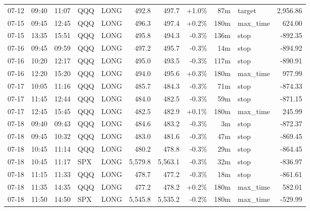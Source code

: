 \documentclass[11pt,a4paper,twoside]{article}
\begin{document}
\begin{center}
\begin{longtable}{>{\color{txtmain}}l l l l l r r r r >{\color{txtmain}}l r}
07-12 & 09:40 & 11:07 & QQQ & LONG & 492.8 & 497.7 & \textcolor{wingreen}{+1.0\%} & 87m & target & \textcolor{wingreen}{2,956.86} \\
07-15 & 09:45 & 12:45 & QQQ & LONG & 496.3 & 497.4 & \textcolor{wingreen}{+0.2\%} & 180m & max\_time & \textcolor{wingreen}{624.00} \\
07-15 & 13:35 & 15:51 & QQQ & LONG & 495.8 & 494.3 & \textcolor{lossred}{-0.3\%} & 136m & stop & \textcolor{lossred}{-892.35} \\
07-16 & 09:45 & 09:59 & QQQ & LONG & 497.2 & 495.7 & \textcolor{lossred}{-0.3\%} & 14m & stop & \textcolor{lossred}{-894.92} \\
07-16 & 10:20 & 12:17 & QQQ & LONG & 495.0 & 493.5 & \textcolor{lossred}{-0.3\%} & 117m & stop & \textcolor{lossred}{-890.91} \\
07-16 & 12:20 & 15:20 & QQQ & LONG & 494.0 & 495.6 & \textcolor{wingreen}{+0.3\%} & 180m & max\_time & \textcolor{wingreen}{977.99} \\
07-17 & 10:05 & 11:16 & QQQ & LONG & 485.7 & 484.3 & \textcolor{lossred}{-0.3\%} & 71m & stop & \textcolor{lossred}{-874.33} \\
07-17 & 11:45 & 12:44 & QQQ & LONG & 484.0 & 482.5 & \textcolor{lossred}{-0.3\%} & 59m & stop & \textcolor{lossred}{-871.15} \\
07-17 & 12:45 & 15:45 & QQQ & LONG & 482.5 & 482.9 & \textcolor{wingreen}{+0.1\%} & 180m & max\_time & \textcolor{wingreen}{245.99} \\
07-18 & 09:40 & 09:43 & QQQ & LONG & 484.6 & 483.2 & \textcolor{lossred}{-0.3\%} & 3m & stop & \textcolor{lossred}{-872.37} \\
07-18 & 09:45 & 10:32 & QQQ & LONG & 483.0 & 481.6 & \textcolor{lossred}{-0.3\%} & 47m & stop & \textcolor{lossred}{-869.45} \\
07-18 & 10:45 & 11:14 & QQQ & LONG & 480.2 & 478.8 & \textcolor{lossred}{-0.3\%} & 29m & stop & \textcolor{lossred}{-864.45} \\
07-18 & 10:45 & 11:17 & SPX & LONG & 5,579.8 & 5,563.1 & \textcolor{lossred}{-0.3\%} & 32m & stop & \textcolor{lossred}{-836.97} \\
07-18 & 11:15 & 11:33 & QQQ & LONG & 478.7 & 477.2 & \textcolor{lossred}{-0.3\%} & 18m & stop & \textcolor{lossred}{-861.61} \\
07-18 & 11:35 & 14:35 & QQQ & LONG & 477.2 & 478.2 & \textcolor{wingreen}{+0.2\%} & 180m & max\_time & \textcolor{wingreen}{582.01} \\
07-18 & 11:50 & 14:50 & SPX & LONG & 5,545.8 & 5,535.2 & \textcolor{lossred}{-0.2\%} & 180m & max\_time & \textcolor{lossred}{-529.99} \\

\end{longtable}
\end{center}
\end{document}
